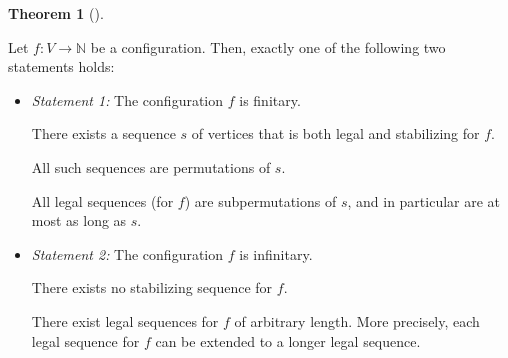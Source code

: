 \documentclass[numbers=enddot,12pt,final,onecolumn,notitlepage]{scrartcl}%
\theoremstyle{definition}
\newtheorem{theo}{Theorem}[section]
\newenvironment{theorem}[1][]
{\begin{theo}[#1]\begin{leftbar}}
{\end{leftbar}\end{theo}}
\newcommand{\NN}{\mathbb{N}}
\begin{document}
\begin{theorem} \label{thm.chip.dichotomy}
Let $f : V \to \NN$ be a configuration.
Then, exactly one of the following two statements holds:

\begin{itemize}
\item \textit{Statement 1:}
      The configuration $f$ is finitary. \par
      There exists a sequence $s$ of vertices that is both
      legal and stabilizing for $f$. \par
      All such sequences are permutations of $s$.
      \par
      All legal sequences (for $f$) are subpermutations
      of $s$, and in particular are at most as long as $s$.

\item \textit{Statement 2:}
      The configuration $f$ is infinitary. \par
      There exists no stabilizing sequence for $f$. \par
      There exist legal sequences for $f$ of arbitrary length.
      More precisely, each legal sequence for $f$ can be
      extended to a longer legal sequence.
\end{itemize}
\end{theorem}
\end{document}
